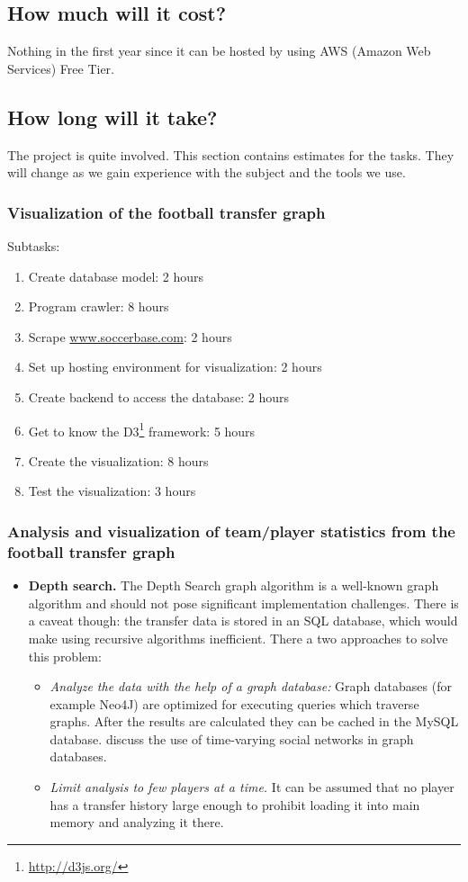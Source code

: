 \documentclass{article}
\begin{document}
\subsection{How much will it cost?}
Nothing in the first year since it can be hosted by using AWS (Amazon Web Services) Free Tier.

\subsection{How long will it take?}
The project is quite involved. This section contains estimates for the tasks. They will change as we gain experience with the subject and the tools we use.

\subsubsection{Visualization of the football transfer graph}
Subtasks:
\begin{enumerate}
\item Create database model: 2 hours
\item Program crawler: 8 hours
\item Scrape \url{www.soccerbase.com}: 2 hours
\item Set up hosting environment for visualization: 2 hours
\item Create backend to access the database: 2 hours
\item Get to know the D3\footnote{\url{http://d3js.org/}} framework: 5 hours
\item Create the visualization: 8 hours
\item Test the visualization: 3 hours
\end{enumerate}

\subsubsection{Analysis and visualization of team/player statistics from the football transfer graph}
\begin{itemize}
\item \textbf{Depth search.} The Depth Search graph algorithm is a well-known graph algorithm and should not pose significant implementation challenges. There is a caveat though: the transfer data is stored in an SQL database, which would make using recursive algorithms inefficient. There a two approaches to solve this problem:
	\begin{itemize}
	\item \textit{Analyze the data with the help of a graph database:} Graph databases (for example Neo4J) are optimized for executing queries which traverse graphs. After the results are calculated they can be cached in the MySQL database. \cite{Cattuto:2013:TSN:2484425.2484442} discuss the use of time-varying social networks in graph databases.
	\item \textit{Limit analysis to few players at a time.} It can be assumed that no player has a transfer history large enough to prohibit loading it into main memory and analyzing it there.
	\end{itemize}
\end{itemize}
\end{document}
